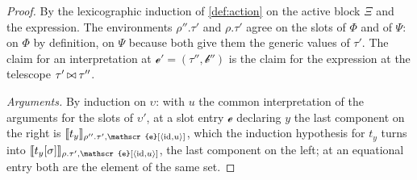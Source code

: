 \begin{proof}
    By the lexicographic induction of \cref{def:action} on the active block $\Xi$ and the expression. The environments $\rho''.\tau'$ and $\rho.\tau'$ agree on the slots of $\Phi$ and of $\Psi$: on $\Phi$ by definition, on $\Psi$ because both give them the generic values of $\tau'$. The claim for an interpretation at $\mathscr{e}' = (\tau'', \mathscr{b}'')$ is the claim for the expression at the telescope $\tau' \mathbin{\bowtie} \tau''$.

    \emph{Arguments.} By induction on $\upsilon$: with $u$ the common interpretation of the arguments for the slots of $\upsilon'$, at a slot entry $\mathscr{e}$ declaring $y$ the last component on the right is $\sem{t_y}_{\rho''.\tau', \mathscr{e}[\langle \id, u \rangle]}$, which the induction hypothesis for $t_y$ turns into $\sem{t_y[\sigma]}_{\rho.\tau', \mathscr{e}[\langle \id, u \rangle]}$, the last component on the left; at an equational entry both are the element of the same set.


\end{proof}
